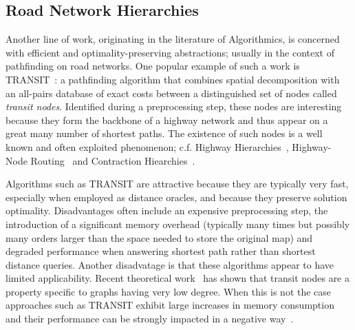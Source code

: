 \subsection{Road Network Hierarchies}
Another line of work, originating in the literature of Algorithmics, is concerned with efficient 
and optimality-preserving abstractions; usually in the context of pathfinding on road networks.
One popular example of such a work is TRANSIT~\citep{bast06,bast07}: a pathfinding algorithm that combines
spatial decomposition with an all-pairs database of exact costs between a distinguished set of nodes
called \emph{transit nodes}. Identified during a preprocessing step, these nodes are interesting 
because they form the backbone of a highway network and thus appear on a great many number of 
shortest paths. The existence of such nodes is a well known and often exploited
phenomenon; c.f. Highway Hierarchies~\citep{sanders05,sanders06}, Highway-Node Routing~\citep{schultes07}
and Contraction Hiearchies~\citep{geisberger08}. 

Algorithms such as TRANSIT are attractive because they are typically very fast, especially when employed
as distance oracles, and because they preserve solution optimality. Disadvantages often include
an expensive preprocessing step, the introduction of a significant memory overhead (typically
many times but possibly many orders larger than the space needed to store the original map) and 
degraded performance when answering shortest path rather than shortest distance queries.
Another disadvatage is that these algorithms appear to have limited applicability. Recent theoretical 
work~\citep{abraham10} has shown that transit nodes are a property specific to graphs having 
very low degree. When this is not the case approaches such as TRANSIT exhibit large increases in memory consumption and their performance can be strongly impacted in a negative way~\citep{antsfeld12}.
